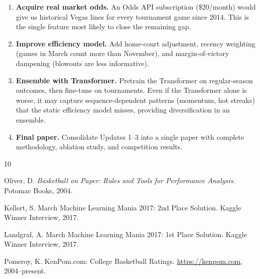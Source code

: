 \documentclass[11pt,a4paper]{article}
\begin{document}
\begin{enumerate}[nosep]
    \item \textbf{Acquire real market odds.} An Odds API subscription (\$20/month) would give us historical Vegas lines for every tournament game since 2014. This is the single feature most likely to close the remaining gap.
    \item \textbf{Improve efficiency model.} Add home-court adjustment, recency weighting (games in March count more than November), and margin-of-victory dampening (blowouts are less informative).
    \item \textbf{Ensemble with Transformer.} Pretrain the Transformer on regular-season outcomes, then fine-tune on tournaments. Even if the Transformer alone is worse, it may capture sequence-dependent patterns (momentum, hot streaks) that the static efficiency model misses, providing diversification in an ensemble.
    \item \textbf{Final paper.} Consolidate Updates 1--3 into a single paper with complete methodology, ablation study, and competition results.
\end{enumerate}



\begin{thebibliography}{10}

Oliver, D.
\newblock \textit{Basketball on Paper: Rules and Tools for Performance Analysis}.
\newblock Potomac Books, 2004.

Kellert, S.
\newblock March Machine Learning Mania 2017: 2nd Place Solution.
\newblock Kaggle Winner Interview, 2017.

Landgraf, A.
\newblock March Machine Learning Mania 2017: 1st Place Solution.
\newblock Kaggle Winner Interview, 2017.

Pomeroy, K.
\newblock KenPom.com: College Basketball Ratings.
\newblock \url{https://kenpom.com}, 2004--present.

\end{thebibliography}
\end{document}
